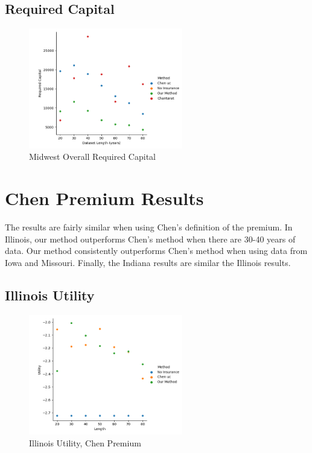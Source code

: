 \documentclass[11pt]{article}
\begin{document}
    \subsection{Required Capital}
    \begin{figure}[h]
        \caption{Midwest Overall Required Capital}
        \centering
        \includegraphics[width=0.6\textwidth]{../../../output/figures/Midwest Evaluation/Midwest_Required Capital_Length.png}
    \end{figure}
    \FloatBarrier

\section{Chen Premium Results}
  The results are fairly similar when using Chen's definition of the premium. In Illinois, our method outperforms Chen's method when there are 30-40 years of data. Our method consistently outperforms Chen's method when using data from Iowa and Missouri. Finally, the Indiana results are similar the Illinois results. 
    \subsection{Illinois Utility}
        \begin{figure}[h]
            \centering
            \includegraphics[width=0.6\textwidth]{../../../output/figures/Chen Premium/Illinois_Utility_Length_ml1241.png}
            \caption{Illinois Utility, Chen Premium}
        \end{figure}
        \FloatBarrier
\end{document}
